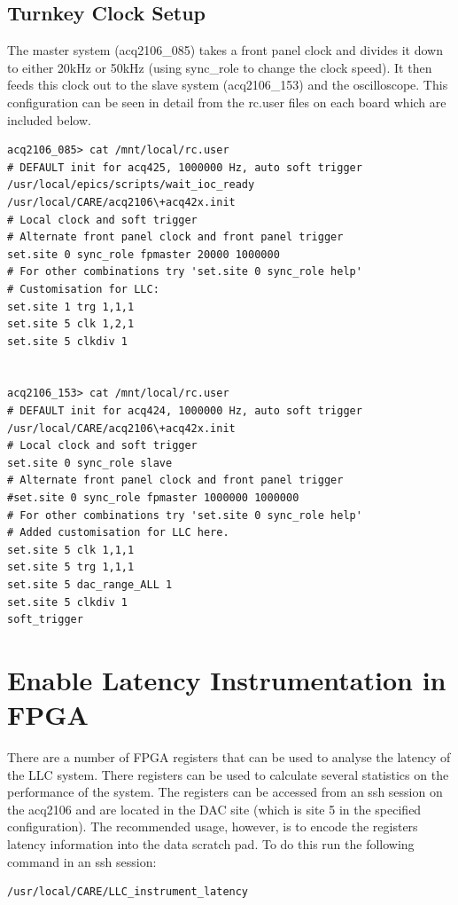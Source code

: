 \documentclass{article}
\begin{document}
\subsection{Turnkey Clock Setup}
The master system (acq2106\_085) takes a front panel clock and divides it down to either 20kHz or 50kHz (using sync\_role to change the clock speed).
It then feeds this clock out to the slave system (acq2106\_153) and the oscilloscope.
This configuration can be seen in detail from the rc.user files on each board which are included below.

\begin{verbatim}
acq2106_085> cat /mnt/local/rc.user
# DEFAULT init for acq425, 1000000 Hz, auto soft trigger
/usr/local/epics/scripts/wait_ioc_ready
/usr/local/CARE/acq2106\+acq42x.init
# Local clock and soft trigger
# Alternate front panel clock and front panel trigger
set.site 0 sync_role fpmaster 20000 1000000
# For other combinations try 'set.site 0 sync_role help'
# Customisation for LLC:
set.site 1 trg 1,1,1
set.site 5 clk 1,2,1
set.site 5 clkdiv 1


acq2106_153> cat /mnt/local/rc.user
# DEFAULT init for acq424, 1000000 Hz, auto soft trigger
/usr/local/CARE/acq2106\+acq42x.init
# Local clock and soft trigger
set.site 0 sync_role slave
# Alternate front panel clock and front panel trigger
#set.site 0 sync_role fpmaster 1000000 1000000
# For other combinations try 'set.site 0 sync_role help'
# Added customisation for LLC here.
set.site 5 clk 1,1,1
set.site 5 trg 1,1,1
set.site 5 dac_range_ALL 1
set.site 5 clkdiv 1
soft_trigger
\end{verbatim}

\section{Enable Latency Instrumentation in FPGA}
There are a number of FPGA registers that can be used to analyse the latency of the LLC system.
There registers can be used to calculate several statistics on the performance of the system.
The registers can be accessed from an ssh session on the acq2106 and are located in the DAC site (which is site 5 in the specified configuration).
The recommended usage, however, is to encode the registers latency information into the data scratch pad.
To do this run the following command in an ssh session:

\begin{verbatim}/usr/local/CARE/LLC_instrument_latency\end{verbatim}
\end{document}

